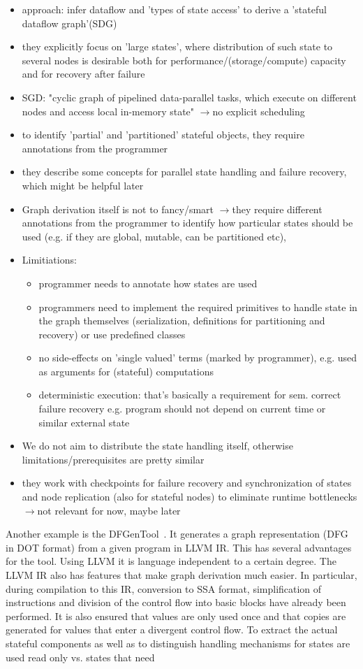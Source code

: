 \documentclass{scrartcl}
\newcommand{\means}{$\rightarrow{}$}
\begin{document}
\begin{itemize}
    \item approach: infer dataflow and 'types of state access' to derive a 'stateful dataflow graph'(SDG)
    \item they explicitly focus on 'large states', where distribution of such state to several nodes is desirable both for performance/(storage/compute) capacity and for recovery after failure 
    \item SGD: "cyclic graph of pipelined data-parallel tasks, which execute on different nodes and access local in-memory state" \means no explicit scheduling
\item to identify 'partial' and 'partitioned' stateful objects, they require annotations from the programmer
\item they describe some concepts for parallel state handling and failure recovery, which might be helpful later
\item Graph derivation itself is not to fancy/smart \means  they require different annotations from the programmer to identify how particular states should be used (e.g. if they are global, mutable, can be partitioned etc), 
\item Limitiations:
\begin{itemize}
    \item programmer needs to annotate how states are used
    \item programmers need to implement the required primitives to handle state in the graph themselves (serialization, definitions for partitioning and recovery) or use predefined classes
    \item no side-effects on 'single valued' terms (marked by programmer), e.g. used as arguments for (stateful) computations
    \item deterministic execution: that's basically a requirement for sem. correct failure recovery e.g. program should not depend on current time or similar external state 
\end{itemize}
\item We do not aim to distribute the state handling itself, otherwise limitations/prerequisites are pretty similar
\item they work with checkpoints for failure recovery and synchronization of states and node replication (also for stateful nodes) to eliminate runtime bottlenecks \means not relevant for now, maybe later
\end{itemize}

Another example is the DFGenTool~\cite{mukherjee2017dfgentool}. It generates a graph representation (DFG in DOT format) from a given program in LLVM IR. This has several advantages for the tool. Using LLVM it is language independent to a certain degree. The LLVM IR also has features that make graph derivation much easier. In particular, during compilation to this IR, conversion to SSA format, simplification of instructions and division of the control flow into basic blocks have already been performed. It is also ensured that values are only used once and that copies are generated for values that enter a divergent control flow. To extract the actual stateful components as well as to distinguish handling mechanisms for states are used read only vs. states that need 
\end{document}
